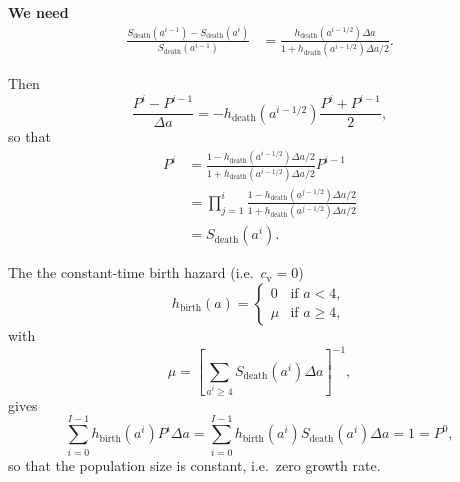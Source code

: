 \documentclass[12pt]{article}
\begin{document}
\textbf{We need}
\begin{displaymath}
  \begin{split}
    \frac{
      S_{\text{death}}(a^{i - 1}) - S_{\text{death}}(a^i)
    }{
      S_{\text{death}}(a^{i - 1})
    }
    &= \frac{
      h_{\text{death}}(a^{i - 1 / 2}) \Delta a
    }{
      1 + h_{\text{death}}(a^{i - 1 / 2}) \Delta a / 2
    }.
  \end{split}
\end{displaymath}
%

Then
\begin{equation}
  \frac{P^i - P^{i - 1}}{\Delta a}
  = - h_{\text{death}}(a^{i - 1 / 2})
  \frac{P^i + P^{i - 1}}{2},
\end{equation}
so that
\begin{equation}
  \label{eq:discrete_total}
  \begin{split}
    P^i
    &= \frac{
      1 - h_{\text{death}}(a^{i - 1 / 2}) \Delta a / 2
    }{
      1 + h_{\text{death}}(a^{i - 1 / 2}) \Delta a / 2
    } P^{i - 1}
    \\
    &= \prod_{j = 1}^i \frac{
      1 - h_{\text{death}}(a^{j - 1 / 2}) \Delta a / 2
    }{
      1 + h_{\text{death}}(a^{j - 1 / 2}) \Delta a / 2
    }
    \\
    &= S_{\text{death}}(a^i).
  \end{split}
\end{equation}

The the constant-time birth hazard
(i.e.~$c_{\mathrm{v}} = 0$)
\begin{equation}
  h_{\text{birth}}(a) =
  \begin{cases}
    0 & \text{if $a < 4$}, \\
    \mu & \text{if $a \geq 4$},
  \end{cases}
\end{equation}
with
\begin{equation}
  \mu =
  \left[
    \sum_{a^i \geq 4}
    S_{\text{death}}(a^i)
    \Delta a
  \right]^{-1},
\end{equation}
gives
\begin{equation}
  \sum_{i = 0}^{I - 1}
  h_{\text{birth}}(a^i) P^i
  \Delta a
  = \sum_{i = 0}^{I - 1}
  h_{\text{birth}}(a^i) S_{\text{death}}(a^i)
  \Delta a
  = 1 = P^0,
\end{equation}
so that the population size is constant, i.e.~zero growth rate.




\end{document}
